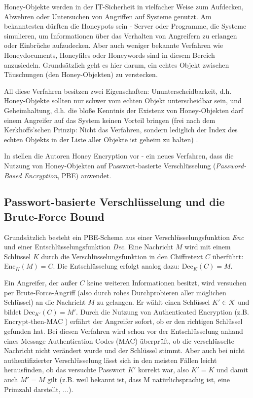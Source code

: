 Honey-Objekte werden in der IT-Sicherheit in vielfacher Weise zum Aufdecken, Abwehren oder Untersuchen von Angriffen auf Systeme genutzt. Am bekanntesten dürften die Honeypots sein - Server oder Programme, die Systeme simulieren, um Informationen über das Verhalten von Angreifern zu erlangen oder Einbrüche aufzudecken. Aber auch weniger bekannte Verfahren wie Honeydocuments, Honeyfiles oder Honeywords sind in diesem Bereich anzusiedeln. Grundsätzlich geht es hier darum, ein echtes Objekt zwischen Täuschungen (den Honey-Objekten) zu verstecken. 

All diese Verfahren besitzen zwei Eigenschaften: Ununterscheidbarkeit, d.h. Honey-Objekte sollten nur schwer vom echten Objekt unterscheidbar sein, und Geheimhaltung, d.h. die bloße Kenntnis der Existenz von Honey-Objekten darf einem Angreifer auf das System keinen Vorteil bringen (frei nach dem Kerkhoffs'schen Prinzip: Nicht das Verfahren, sondern lediglich der Index des echten Objekts in der Liste aller Objekte ist geheim zu halten) \cite{SACMAT2014}.

In \cite{EURO2014} stellen die Autoren Honey Encryption vor - ein neues Verfahren, dass die Nutzung von Honey-Objekten auf Passwort-basierte Verschlüsselung (\textit{Password-Based Encryption}, PBE) anwendet.

\subsection{Passwort-basierte Verschlüsselung und die Brute-Force Bound}

Grundsätzlich besteht ein PBE-Schema aus einer Verschlüsselungsfunktion \textit{Enc} und einer Entschlüsselungsfunktion \textit{Dec}. Eine Nachricht \(M\) wird mit einem Schlüssel \(K\) durch die Verschlüsselungsfunktion in den Chiffretext \(C\) überführt: \(\text{Enc}_K(M)=C\). Die Entschlüsselung erfolgt analog dazu: \(\text{Dec}_K(C)=M\). 

Ein Angreifer, der außer \(C\) keine weiteren Informationen besitzt, wird versuchen per Brute-Force-Angriff (also durch rohes Durchprobieren aller möglichen Schlüssel) an die Nachricht \(M\) zu gelangen. Er wählt einen Schlüssel \(K' \in \mathcal{K}\) und bildet \(\text{Dec}_{K'}(C)=M'\). Durch die Nutzung von Authenticated Encryption (z.B. Encrypt-then-MAC \cite{AE2000}) erfährt der Angreifer sofort, ob er den richtigen Schlüssel gefunden hat. Bei diesen Verfahren wird schon vor der Entschlüsselung anhand eines Message Authentication Codes (MAC) überprüft, ob die verschlüsselte Nachricht nicht verändert wurde und der Schlüssel stimmt. Aber auch bei nicht authentifizierter Verschlüsselung lässt sich in den meisten Fällen leicht herausfinden, ob das versuchte Passwort \(K'\) korrekt war, also \(K'=K\) und damit auch \(M'=M\) gilt (z.B. weil bekannt ist, dass M natürlichsprachig ist, eine Primzahl darstellt, ...). 

